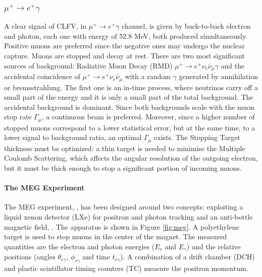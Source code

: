 \subsubsection{$\mu^+ \rightarrow e^+ \gamma$}
A clear signal of CLFV, in $\mu^+ \rightarrow e^+ \gamma$ channel, is given by back-to-back electron and photon, each one with energy of 52.8 MeV, 
both produced simultaneously. Positive muons are preferred since the negative ones may undergo the nuclear capture. 
Muons are stopped and decay at rest. There are two most significant sources of background: Radiative Muon Decay (RMD) $\mu^+ \rightarrow e^+ \nu_e \bar{\nu}_\mu \gamma$ 
and the accidental coincidence of $\mu^+ \rightarrow e^+ \nu_e \bar{\nu}_\mu$ with a random $\gamma$ 
generated by annihilation or bremsstrahlung. The first one is an in-time process, where neutrinos carry off a small part of the energy 
and it is only a small part of the total background. The accidental background is dominant. Since both backgrounds scale with the muon stop rate $\Gamma_\mu$, a continuous beam is preferred. 
Moreover, since a higher number of stopped muons correspond to a lower statistical error, but at the same time, to a lower signal to background ratio, an optimal $\Gamma_\mu$ exists.
The Stopping Target thickness must be optimized: a thin target is needed to minimise the Multiple Coulomb Scattering, which affects the angular resolution of the outgoing electron, but 
it must be thick enough to stop a significant portion of incoming muons. 
\paragraph{The MEG Experiment}
The MEG experiment, \cite{megi}, has been designed around two concepts: exploiting a liquid
xenon detector (LXe) for positron and photon tracking and an anti-bottle magnetic field, \cite{clfv_signorelli}. 
The apparatus is shown in Figure \ref{fig:meg}. A polyethylene target is used to stop muons in the center of the magnet. 
The measured quantities are the electron and photon energies ($E_e$ and $E_\gamma$) and the
relative positions (angles $\theta_{e\gamma}$, $\phi_{e\gamma}$ and time $t_{e \gamma}$).
A combination of a drift chamber (DCH) and plastic scintillator timing counters (TC) measure the positron momentum.

